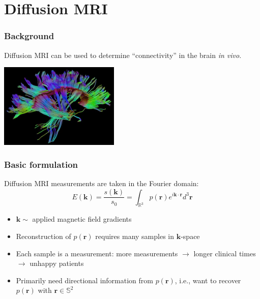 \documentclass{beamer}
\begin{document}
  \section{Diffusion MRI}
  \frame
  {
    \frametitle{Background} 
    Diffusion MRI can be used to determine ``connectivity'' in the brain \emph{in vivo}. 
  \begin{center}
    \includegraphics[width = 2.25in]{MRI-DTIBrain-9223.jpg}
  \end{center}

  }%
  \frame
  {
    \frametitle{Basic formulation} 
    Diffusion MRI measurements are taken in the Fourier domain:
    \begin{equation}
      E\left(\mathbf{k}\right) = \frac{s\left(\mathbf{k}\right)}{s_0} = \int_{\mathbb{R}^3} p\left(\mathbf{r}\right)e^{i \mathbf{k}\cdot\mathbf{r}}d^3\mathbf{r}
    \end{equation}
    \begin{itemize}
      \item{$\mathbf{k} \sim $ applied magnetic field gradients}
      \item{Reconstruction of $p\left(\mathbf{r}\right)$ requires many samples in $\mathbf{k}$-space}
      \item{Each sample is a measurement: more measurements $\rightarrow$ longer clinical times $\rightarrow$ unhappy patients}
      \item{Primarily need directional information from $p\left(\mathbf{r}\right)$, i.e., want to recover $p\left(\mathbf{r}\right)$ with $\mathbf{r}\in\mathbb{S}^2$}
    \end{itemize}
  }
  \frame
\end{document}
